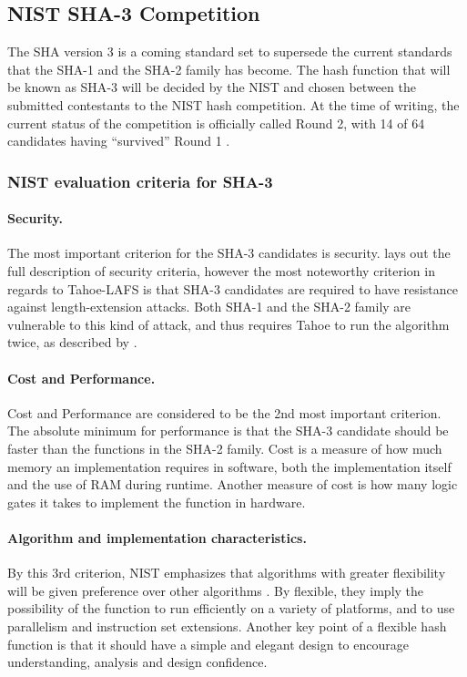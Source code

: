 \documentclass[english,12pt,a4paper]{book}
\begin{document}
\subsection{NIST SHA-3 Competition}
The \ac{SHA} version 3 is a coming standard set to supersede the current
standards that the \ac{SHA}-1 and the \ac{SHA}-2 family has become. The hash
function that will be known as \ac{SHA}-3 will be decided by the \ac{NIST} and
chosen between the submitted contestants to the \ac{NIST} hash competition.
At the time of writing, the current status of the competition is officially
called Round 2, with 14 of 64 candidates having ``survived'' Round 1
\cite{s_fedreg}.

\subsubsection{\ac{NIST} evaluation criteria for \ac{SHA}-3}

\label{sec:lengthextension}
\paragraph{Security.} The most important criterion for the SHA-3
candidates\cite{s_nistround2} is security. \citet{s_fedreg} lays out the full
description of security criteria, however the most noteworthy criterion
in regards to Tahoe-\ac{LAFS} is that \ac{SHA}-3 candidates are required to have
resistance against length-extension attacks. Both \ac{SHA}-1 and the \ac{SHA}-2
family are vulnerable to this kind of attack, and thus requires
Tahoe to run the algorithm twice, as described by \citet{schneier}.

\paragraph{Cost and Performance.} Cost and Performance are considered to be the
2nd most important criterion. The absolute minimum for performance is that the
SHA-3 candidate should be faster than the functions in the \ac{SHA}-2 family.
Cost is a measure of how much memory an implementation requires in software,
both the implementation itself and the use of \ac{RAM} during runtime. Another
measure of cost is how many logic gates it takes to implement the function in
hardware.

\paragraph{Algorithm and implementation characteristics.} By this 3rd criterion,
\ac{NIST} emphasizes that algorithms with greater flexibility will be given
preference over other algorithms \cite{s_nistround2}. By flexible, they imply
the possibility of the function to run efficiently on a variety of platforms,
and to use parallelism and instruction set extensions. Another key point of a
flexible hash function is that it should have a simple and elegant design to
encourage understanding, analysis and design confidence.
\end{document}
